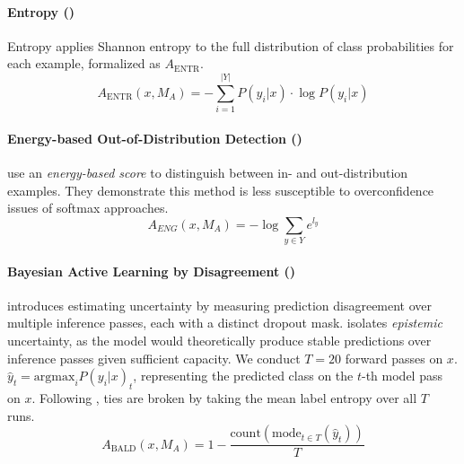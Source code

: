         \paragraph{Entropy (\entr)}
        Entropy applies Shannon entropy \citep{shannon1948mathematical} to the full distribution of class probabilities for each example, formalized as $A_{\text{ENTR}}$.
        \respace
        \respace
         $$ A_{\text{ENTR}}(x, M_A) = -\sum_{i = 1}^{|Y|} { P(y_i|x) \cdot \log{P(y_i|x)}  }$$ 
        

        \respace
        \respace
        \paragraph{Energy-based Out-of-Distribution Detection (\eod)}
        \citet{liu2020energy} use an \textit{energy-based score} to distinguish between in- and out-distribution examples.
        They demonstrate this method is less susceptible to overconfidence issues of softmax approaches.
        \respace
        $$ A_{ENG}(x, M_A) = - \log \sum_{y \in Y} e^{l_y} $$ 
        \respace
        \respace
        \paragraph{Bayesian Active Learning by Disagreement (\bald)}
        \citet{gal2016} introduces estimating uncertainty by measuring prediction disagreement over multiple inference passes, each with a distinct dropout mask.
        \bald{} isolates \textit{epistemic} uncertainty, as the model would theoretically produce stable predictions over inference passes given sufficient capacity.
        We conduct $T=20$ forward passes on $x$.
        $\hat{y}_t = \text{argmax}_{i}P(y_i|x)_t$, representing the predicted class on the $t$-th model pass on $x$.
        Following \citep{lowell2019practical}, ties are broken by taking the mean label entropy over all $T$ runs. 
        \respace
        \respace
        $$ A_{\text{BALD}}(x, M_{A}) = 1 - \frac{\text{count}(\text{mode}_{t \in T} (\hat{y}_t))}{T} $$
        
        
